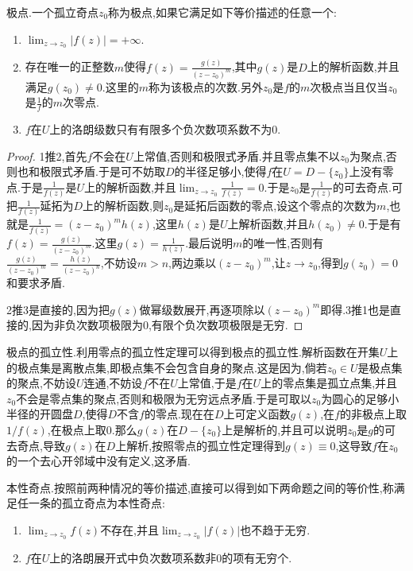 极点.一个孤立奇点$z_0$称为极点,如果它满足如下等价描述的任意一个:
\begin{enumerate}
	\item $\lim_{z\to z_0}|f(z)|=+\infty$.
	\item 存在唯一的正整数$m$使得$f(z)=\frac{g(z)}{(z-z_0)^m}$,其中$g(z)$是$D$上的解析函数,并且满足$g(z_0)\not=0$.这里的$m$称为该极点的次数.另外$z_0$是$f$的$m$次极点当且仅当$z_0$是$\frac{1}{f}$的$m$次零点.
	\item $f$在$U$上的洛朗级数只有有限多个负次数项系数不为0.
\end{enumerate}
\begin{proof}
	
	1推2,首先$f$不会在$U$上常值,否则和极限式矛盾.并且零点集不以$z_0$为聚点,否则也和极限式矛盾.于是可不妨取$D$的半径足够小,使得$f$在$U=D-\{z_0\}$上没有零点.于是$\frac{1}{f(z)}$是$U$上的解析函数,并且$\lim_{z\to z_0}\frac{1}{f(z)}=0$.于是$z_0$是$\frac{1}{f(z)}$的可去奇点.可把$\frac{1}{f(z)}$延拓为$D$上的解析函数,则$z_0$是延拓后函数的零点,设这个零点的次数为$m$,也就是$\frac{1}{f(z)}=(z-z_0)^mh(z)$,这里$h(z)$是$U$上解析函数,并且$h(z_0)\not=0$.于是有$f(z)=\frac{g(z)}{(z-z_0)^m}$.这里$g(z)=\frac{1}{h(z)}$.最后说明$m$的唯一性,否则有$\frac{g(z)}{(z-z_0)^m}=\frac{h(z)}{(z-z_0)^n}$,不妨设$m>n$,两边乘以$(z-z_0)^m$,让$z\to z_0$,得到$g(z_0)=0$和要求矛盾.
	
	2推3是直接的,因为把$g(z)$做幂级数展开,再逐项除以$(z-z_0)^m$即得.3推1也是直接的,因为非负次数项极限为0,有限个负次数项极限是无穷.
\end{proof}

极点的孤立性.利用零点的孤立性定理可以得到极点的孤立性.解析函数在开集$U$上的极点集是离散点集,即极点集不会包含自身的聚点.这是因为,倘若$z_0\in U$是极点集的聚点,不妨设$U$连通,不妨设$f$不在$U$上常值,于是$f$在$U$上的零点集是孤立点集,并且$z_0$不会是零点集的聚点,否则和极限为无穷远点矛盾.于是可取以$z_0$为圆心的足够小半径的开圆盘$D$,使得$D$不含$f$的零点.现在在$D$上可定义函数$g(z)$,在$f$的非极点上取$1/f(z)$,在极点上取0.那么$g(z)$在$D-\{z_0\}$上是解析的,并且可以说明$z_0$是$g$的可去奇点,导致$g(z)$在$D$上解析,按照零点的孤立性定理得到$g(z)\equiv0$,这导致$f$在$z_0$的一个去心开邻域中没有定义,这矛盾.

本性奇点.按照前两种情况的等价描述,直接可以得到如下两命题之间的等价性,称满足任一条的孤立奇点为本性奇点:
\begin{enumerate}
	\item $\lim_{z\to z_0}f(z)$不存在,并且$\lim_{z\to z_0}|f(z)|$也不趋于无穷.
	\item $f$在$U$上的洛朗展开式中负次数项系数非0的项有无穷个.
\end{enumerate}

